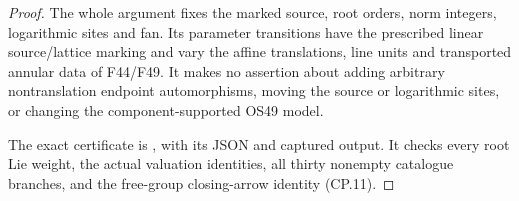 \begin{proof}
The whole argument fixes the marked source, root orders, norm
integers, logarithmic sites and fan. Its parameter transitions have
the prescribed linear source/lattice marking and vary the affine
translations, line units and transported annular data of F44/F49.
It makes no assertion about adding arbitrary nontranslation endpoint
automorphisms, moving the source or logarithmic sites, or changing
the component-supported OS49 model.

The exact certificate is ,
with its JSON and captured output. It checks every root Lie weight,
the actual valuation identities, all thirty nonempty catalogue
branches, and the free-group closing-arrow identity (CP.11).

\end{proof}
